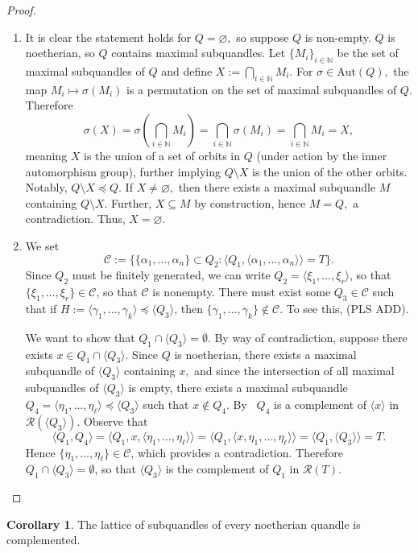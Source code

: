 \documentclass[reqno,dvipsnames]{amsart}
\let\mc\mathcal
\renewcommand{\l}{\left}
\renewcommand{\r}{\right}
\newcommand{\la}{\langle}
\newcommand{\ra}{\rangle}
\newcommand{\N}{\mathbb{N}}
\renewcommand{\a}{\alpha}
\newcommand{\Aut}{\text{Aut}}
\theoremstyle{definition}
\newtheorem{corollary}[theorem]{Corollary}
\begin{document}
{\begin{proof}\
\begin{enumerate}
    \item It is clear the statement holds for $Q = \varnothing,$ so suppose $Q$ is non-empty. $Q$ is noetherian, so $Q$ contains maximal subquandles. Let $\{M_i\}_{i \in \N}$ be the set of maximal subquandles of $Q$ and define $X := \bigcap_{i \in \N} M_i$. For $\sigma \in \Aut(Q),$ the map $M_i \mapsto \sigma(M_i)$ is a permutation on the set of maximal subquandles of $Q.$ Therefore
    \[\sigma(X) = \sigma\l(\bigcap_{i \in \N} M_i\r) = \bigcap_{i \in \mathbb{N}} \sigma(M_i) = \bigcap_{i \in \mathbb{N}} M_i = X,\]
    meaning $X$ is the union of a set of orbits in $Q$ (under action by the inner automorphism group), further implying $Q \setminus X$ is the union of the other orbits. Notably, $Q \setminus X \preceq Q.$ If $X \neq \varnothing,$ then there exists a maximal subquandle $M$ containing $Q \setminus X.$ Further, $X \subseteq M$ by construction, hence $M = Q,$ a contradiction. Thus, $X = \varnothing.$ 
    \item We set
    \[\mc{C}:=\{\{\a_1,\dots,\a_n\}\subset Q_2:\la Q_1,\la\a_1,\dots,\a_n\ra\ra=T\}.\]
    Since $Q_2$ must be finitely generated, we can write $Q_2=\la\xi_1,\dots,\xi_r\ra$, so that $\{\xi_1,\dots,\xi_r\}\in\mc{C}$, so that $\mc{C}$ is nonempty. There must exist some $Q_3\in\mc{C}$ such that if $H:=\la\gamma_1,\dots,\gamma_k\ra\preceq\la Q_3\ra$, then $\{\gamma_1,\dots,\gamma_k\}\not\in\mc{C}$. To see this, (PLS ADD).

    We want to show that $Q_1\cap\la Q_3\ra=\emptyset$. By way of contradiction, suppose there exists $x\in Q_1\cap\la Q_3\ra$. Since $Q$ is noetherian, there exists a maximal subquandle of $\la Q_3 \ra$ containing $x,$ and since the intersection of all maximal subquandles of $\la Q_3\ra$ is empty, there exists a maximal subquandle $Q_4=\la\eta_1,\dots,\eta_\ell\ra\preceq\la Q_3\ra$ such that $x\not\in Q_4$. By~\cite[Theorem 2.3]{saki2018lattice} $Q_4$ is a complement of $\la x\ra$ in $\mc{R}(\la Q_3\ra)$. Observe that
    \[\la Q_1,Q_4\ra=\la Q_1,x,\la\eta_1,\dots,\eta_\ell\ra\ra=\la Q_1,\la x,\eta_1,\dots,\eta_\ell\ra\ra=\la Q_1,\la Q_3\ra\ra=T.\]
    Hence $\{\eta_1,\dots,\eta_\ell\}\in\mc{C}$, which provides a contradiction. Therefore $Q_1\cap\la Q_3\ra=\emptyset$, so that $\la Q_3\ra$ is the complement of $Q_1$ in $\mc{R}(T)$.
\end{enumerate}
\end{proof}

\begin{corollary}
The lattice of subquandles of every noetherian quandle is complemented.
\end{corollary}

}
\end{document}
